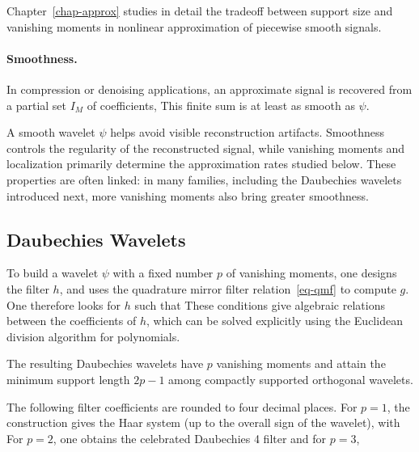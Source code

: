 Chapter~\ref{chap-approx} studies in detail the tradeoff between support size and vanishing moments in nonlinear approximation of piecewise smooth signals.

  
\paragraph{Smoothness.}

In compression or denoising applications, an approximate signal is recovered from a partial set $I_M$ of coefficients,
This finite sum is at least as smooth as $\psi$.

A smooth wavelet $\psi$ helps avoid visible reconstruction artifacts. Smoothness controls the regularity of the reconstructed signal, while vanishing moments and localization primarily determine the approximation rates studied below. These properties are often linked: in many families, including the Daubechies wavelets introduced next, more vanishing moments also bring greater smoothness.


                                   
\subsection{Daubechies Wavelets}

To build a wavelet $\psi$ with a fixed number $p$ of vanishing moments, one designs the filter $h$, and uses the quadrature mirror filter relation~\eqref{eq-qmf} to compute $g$. One therefore looks for $h$ such that
These conditions give algebraic relations between the coefficients of $h$, which can be solved explicitly using the Euclidean division algorithm for polynomials.

The resulting Daubechies wavelets have $p$ vanishing moments and attain the minimum support length $2p-1$ among compactly supported orthogonal wavelets.

The following filter coefficients are rounded to four decimal places. For $p=1$, the construction gives the Haar system (up to the overall sign of the wavelet), with
For $p=2$, one obtains the celebrated Daubechies 4 filter 
and for $p=3$,

